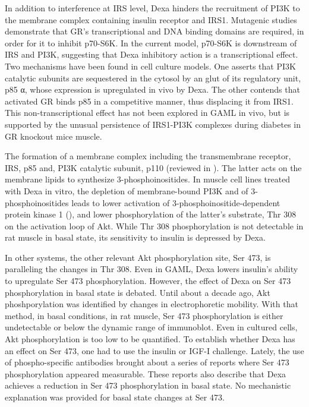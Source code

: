 \documentclass[12pt,english]{report}\usepackage[]{graphicx}\usepackage[]{color}
\begin{document}
In addition to interference at IRS level, Dexa hinders the recruitment
of PI3K to the membrane complex containing insulin receptor and IRS1\citep{saad1993modulation,rojas2003regulation}.
Mutagenic studies demonstrate that GR's transcriptional and DNA binding
domains are required, in order for it to inhibit p70-S6K\citep{shah2002activated}.
In the current model, p70-S6K is downstream of IRS and PI3K, suggesting
that Dexa inhibitory action is a transcriptional effect. Two mechanisms
have been found in cell culture models. One asserts that PI3K catalytic
subunits are sequestered in the cytosol by an glut of its regulatory
unit, p85 α\citep{saad1993modulation,giorgino1997specific,singleton2000dexamethasone},
whose expression is upregulated in vivo by Dexa\citep{wu2010redd1}.
The other contends that activated GR binds p85 in a competitive manner,
thus displacing it from IRS1\citep{hu2009endogenous}. This non-transcriptional
effect has not been explored in GAML in vivo, but is supported by
the unusual persistence of IRS1-PI3K complexes during diabetes in
GR knockout mice muscle.

The formation of a membrane complex including the transmembrane receptor,
IRS, p85 and, PI3K catalytic subunit, p110 (reviewed in \citep{geering2007regulation}).
The latter acts on the membrane lipids to synthesize 3-phosphoinositides.
In muscle cell lines treated with Dexa in vitro, the depletion of
membrane-bound PI3K and of 3-phosphoinositides leads to lower activation
of 3-phosphoinositide-dependent protein kinase 1 (),
and lower phosphorylation of the latter's substrate, Thr 308 on the
activation loop of Akt. While Thr 308 phosphorylation is not detectable
in rat muscle in basal state, its sensitivity to insulin is depressed
by Dexa\citep{buren2008insulin}.

In other systems, the other relevant Akt phosphorylation site, Ser
473, is paralleling the changes in Thr 308. Even in GAML, Dexa lowers
insulin's ability to upregulate Ser 473 phosphorylation\citep{buren2008insulin,rojas2003regulation,williams2012dietary,watson2012cell-autonomous}.
However, the effect of Dexa on Ser 473 phosphorylation in basal state
is debated. Until about a decade ago, Akt phoshporylation was identified
by changes in electrophoretic mobility. With that method, in basal
conditions, in rat muscle, Ser 473 phosphorylation is either undetectable
or below the dynamic range of immunoblot\citep{buren2008insulin,rojas2003regulation,williams2012dietary,watson2012cell-autonomous}.
Even in cultured cells, Akt phosphorylation is too low to be quantified\citep{shah2000glucocorticoidsa,stitt2004igf-1/pi3k/akt,gwag2013inhibition}.
To establish whether Dexa has an effect on Ser 473, one had to use
the insulin or IGF-I challenge. Lately, the use of phospho-specific
antibodies brought about a series of reports where Ser 473 phosphorylation
appeared measurable\citep{fappi2014effects,schakman2008role,cho2010time}.
These reports also describe that Dexa achieves a reduction in Ser
473 phosphorylation in basal state. No mechanistic explanation was
provided for basal state changes at Ser 473.
\end{document}
